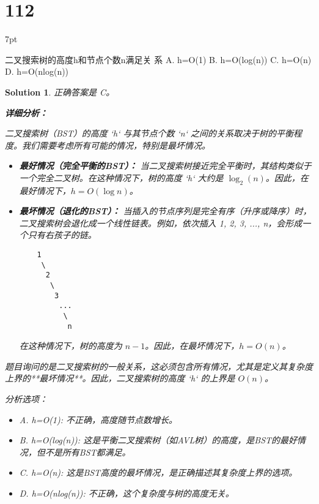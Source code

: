 \documentclass[UTF8]{report}
\newtheorem{solution}{Solution}
\theoremstyle{MyLineTheoremStyle} %
\theoremstyle{MyBlockTheoremStyle} %
\theoremstyle{MySubsubsectionStyle} %
\newenvironment{graybox}{%
        \def\FrameCommand{%
        \hspace{1pt}%
        {\color{gray}\small \vrule width 2pt}%
        {\color{graybox_color}\vrule width 4pt}%
        \colorbox{graybox_color}%
        }%
        \MakeFramed{\advance\hsize-\width\FrameRestore}%
        \noindent\hspace{-4.55pt}%
        \begin{adjustwidth}{}{7pt}%
        \vspace{2pt}\vspace{2pt}%
        }
        {%
        \vspace{2pt}\end{adjustwidth}\endMakeFramed%
        }
\begin{document}
\section*{112}
\begin{graybox}
二叉搜索树的高度h和节点个数n满足关
系
A. h=O(1)
B. h=O(log(n))
C. h=O(n)
D. h=O(nlog(n))
\end{graybox}

\begin{solution}
正确答案是 C。

\textbf{详细分析：}

二叉搜索树（BST）的高度 `h` 与其节点个数 `n` 之间的关系取决于树的平衡程度。我们需要考虑所有可能的情况，特别是最坏情况。

\begin{itemize}
    \item \textbf{最好情况（完全平衡的BST）：}
    当二叉搜索树接近完全平衡时，其结构类似于一个完全二叉树。在这种情况下，树的高度 `h` 大约是 $\log_2(n)$。因此，在最好情况下，$h = O(\log n)$。

    \item \textbf{最坏情况（退化的BST）：}
    当插入的节点序列是完全有序（升序或降序）时，二叉搜索树会退化成一个线性链表。例如，依次插入 1, 2, 3, ..., n，会形成一个只有右孩子的链。
    \begin{verbatim}
    1
     \
      2
       \
        3
         ...
          \
           n
    \end{verbatim}
    在这种情况下，树的高度为 $n-1$。因此，在最坏情况下，$h = O(n)$。
\end{itemize}

题目询问的是二叉搜索树的一般关系，这必须包含所有情况，尤其是定义其复杂度上界的**最坏情况**。因此，二叉搜索树的高度 `h` 的上界是 $O(n)$。

分析选项：
\begin{itemize}
    \item A. h=O(1): 不正确，高度随节点数增长。
    \item B. h=O(log(n)): 这是平衡二叉搜索树（如AVL树）的高度，是BST的最好情况，但不是所有BST都满足。
    \item C. h=O(n): 这是BST高度的最坏情况，是正确描述其复杂度上界的选项。
    \item D. h=O(nlog(n)): 不正确，这个复杂度与树的高度无关。
\end{itemize}
\end{solution}
\end{document}
